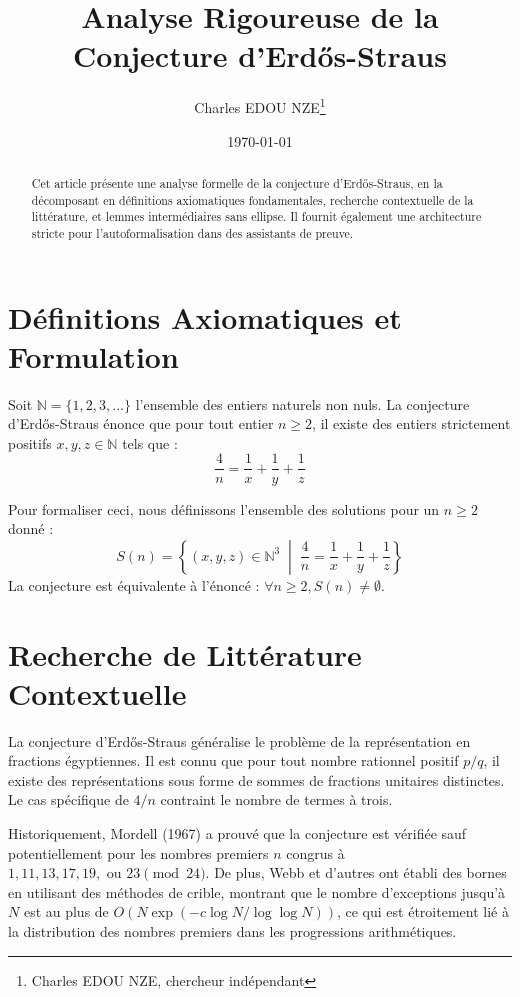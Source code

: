\documentclass[12pt]{article}
\title{Analyse Rigoureuse de la Conjecture d'Erd\H{o}s-Straus}
\author{Charles EDOU NZE\thanks{Charles EDOU NZE, chercheur indépendant}}
\date{\today}
\begin{document}
\maketitle

\begin{abstract}
Cet article présente une analyse formelle de la conjecture d'Erd\H{o}s-Straus, en la décomposant en définitions axiomatiques fondamentales, recherche contextuelle de la littérature, et lemmes intermédiaires sans ellipse. Il fournit également une architecture stricte pour l'autoformalisation dans des assistants de preuve.
\end{abstract}

\section{Définitions Axiomatiques et Formulation}
Soit $\mathbb{N} = \{1, 2, 3, \ldots\}$ l'ensemble des entiers naturels non nuls.
La conjecture d'Erd\H{o}s-Straus énonce que pour tout entier $n \ge 2$, il existe des entiers strictement positifs $x, y, z \in \mathbb{N}$ tels que :
\begin{equation}
\frac{4}{n} = \frac{1}{x} + \frac{1}{y} + \frac{1}{z}
\end{equation}

Pour formaliser ceci, nous définissons l'ensemble des solutions pour un $n \ge 2$ donné :
\begin{equation}
S(n) = \left\{ (x, y, z) \in \mathbb{N}^3 \;\middle|\; \frac{4}{n} = \frac{1}{x} + \frac{1}{y} + \frac{1}{z} \right\}
\end{equation}
La conjecture est équivalente à l'énoncé : $\forall n \ge 2, S(n) \neq \emptyset$.

\section{Recherche de Littérature Contextuelle}
La conjecture d'Erd\H{o}s-Straus généralise le problème de la représentation en fractions égyptiennes. Il est connu que pour tout nombre rationnel positif $p/q$, il existe des représentations sous forme de sommes de fractions unitaires distinctes. Le cas spécifique de $4/n$ contraint le nombre de termes à trois.

Historiquement, Mordell (1967) a prouvé que la conjecture est vérifiée sauf potentiellement pour les nombres premiers $n$ congrus à $1, 11, 13, 17, 19, \text{ ou } 23 \pmod{24}$. De plus, Webb et d'autres ont établi des bornes en utilisant des méthodes de crible, montrant que le nombre d'exceptions jusqu'à $N$ est au plus de $O(N \exp(-c \log N / \log \log N))$, ce qui est étroitement lié à la distribution des nombres premiers dans les progressions arithmétiques.
\end{document}
